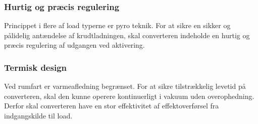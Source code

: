 \subsubsection*{Hurtig og præcis regulering}
\noindent Princippet i flere af load typerne er pyro teknik. For at sikre en sikker og pålidelig antændelse af krudtladningen, skal converteren indeholde en hurtig og præcis regulering af udgangen ved aktivering. 

\subsubsection*{Termisk design}
\noindent Ved rumfart er varmeafledning begrænset. For at sikre tilstrækkelig levetid på converteren, skal den kunne operere kontinuerligt i vakuum uden overophedning. Derfor skal converteren have en stor effektivitet af effektoverførsel fra indgangskilde til load. 

